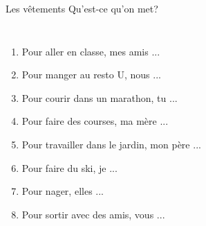 \documentclass{beamer}
\begin{document}
  \begin{frame}[t]{Les vêtements}
    Qu'est-ce qu'on met?
    \vspace{0.5cm}
    \begin{columns}
        \scriptsize
        \begin{enumerate}
          \item Pour aller en classe, mes amis \underline{} ...
          \item Pour manger au resto U, nous \underline{} ...
          \item Pour courir dans un marathon, tu \underline{} ...
          \item Pour faire des courses, ma mère \underline{} ...
          \item Pour travailler dans le jardin, mon père \underline{} ...
          \item Pour faire du ski, je \underline{} ...
          \item Pour nager, elles \underline{} ...
          \item Pour sortir avec des amis, vous \underline{} ...
        \end{enumerate}
        \begin{minipage}[c][0.6\textheight]{\linewidth}
          \begin{center}
          \end{center}
        \end{minipage}
    \end{columns}
  \end{frame}
\end{document}
